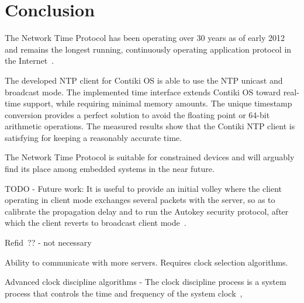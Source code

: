 





\chapter{Conclusion}
The Network Time Protocol has been operating over 30 years as of early 2012
and remains the longest running, continuously operating application
protocol in the Internet~\cite{ntp-y2k}.

The developed NTP client for Contiki OS is able to use the NTP unicast and broadcast mode.
The implemented time interface extends Contiki OS toward real-time support,
while requiring minimal memory amounts.
The unique timestamp conversion provides a perfect solution to avoid the floating point or 64-bit
arithmetic operations.
The measured results show that the Contiki NTP client is satisfying for keeping a reasonably accurate time.

The Network Time Protocol is suitable for constrained devices
and will arguably find its place among embedded systems in the near future.





TODO - Future work:
It is useful to provide an initial volley where the client operating in
client mode exchanges several packets with the server, so as to
calibrate the propagation delay and to run the Autokey security
protocol, after which the client reverts to broadcast client mode~\cite{rfc5905}.

Refid~\cite{rfc5905}?? - not necessary

Ability to communicate with more servers. Requires clock selection algorithms.

Advanced clock discipline algorithms -
The clock discipline process is a system process that controls the
time and frequency of the system clock~\cite{rfc5905},




